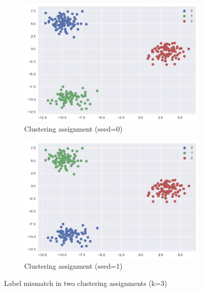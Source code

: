 \begin{figure}
     \centering
     \begin{subfigure}[b]{0.49\textwidth}
         \centering
         \includegraphics[width=\textwidth]{figures/design/cluster-label-switch-1.png}
         \caption{Clustering assignment (seed=0)}
         \label{fig:clustering-label-mismatch-1}
     \end{subfigure}
     \hfill
     \begin{subfigure}[b]{0.49\textwidth}
         \centering
         \includegraphics[width=\textwidth]{figures/design/cluster-label-switch-2.png}
         \caption{Clustering assignment (seed=1)}
         \label{fig:clustering-label-mismatch-2}
     \end{subfigure}
     \caption{Label mismatch in two clustering assignments (k=3)}
     \label{fig:clustering-label-mismatch}
\end{figure}


